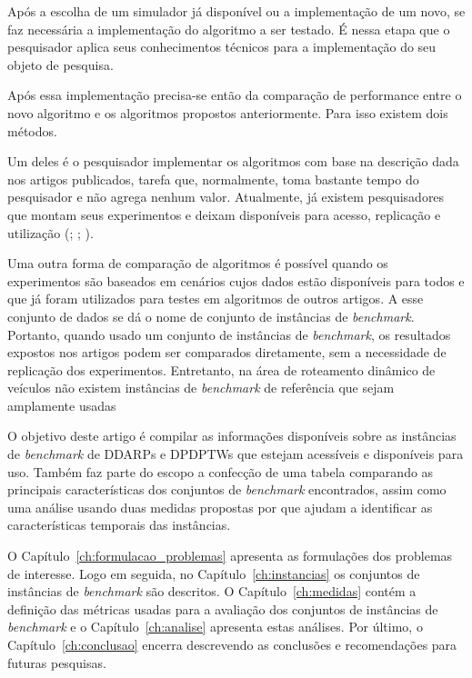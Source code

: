 Após a escolha de um simulador já disponível ou a implementação de um novo, se
faz necessária a implementação do algoritmo a ser testado. 
É nessa etapa que o pesquisador aplica seus conhecimentos técnicos para a 
implementação do seu objeto de pesquisa.

Após essa implementação precisa-se então da comparação de performance entre
o novo algoritmo e os algoritmos propostos anteriormente.
Para isso existem dois métodos.

Um deles é o pesquisador implementar os algoritmos com base na descrição dada 
nos artigos publicados, tarefa que, normalmente, toma bastante tempo do 
pesquisador e não agrega nenhum valor.
Atualmente, já existem pesquisadores que montam seus experimentos e deixam
disponíveis para acesso, replicação e utilização (\cite{van_lon_towards_2015};
\cite{van_lon_measures_2016}; \cite{van_lon_when_2017}).

Uma outra forma de comparação de algoritmos é possível quando os experimentos
são baseados em cenários cujos dados estão disponíveis para todos e
que já foram utilizados para testes em algoritmos de outros artigos.
A esse conjunto de dados se dá o nome de conjunto de instâncias de
\textit{benchmark}.
Portanto, quando usado um conjunto de instâncias de \textit{benchmark}, os
resultados expostos nos artigos podem ser comparados diretamente, sem a
necessidade de replicação dos experimentos.
Entretanto, na área de roteamento dinâmico de veículos não existem instâncias
de \textit{benchmark} de referência que sejam amplamente usadas
\cite{pillac_review_2013}

O objetivo deste artigo é compilar as informações disponíveis sobre as
instâncias de \textit{benchmark} de DDARPs e DPDPTWs que estejam acessíveis e
disponíveis para uso. Também faz parte do escopo a confecção de uma tabela
comparando as principais características dos conjuntos de \textit{benchmark}
encontrados, assim como uma análise usando duas medidas propostas por
\textcite{van_lon_measures_2016} que ajudam a identificar as características
temporais das instâncias.
\fi

O Capítulo~\ref{ch:formulacao_problemas} apresenta as formulações dos problemas
de interesse.
Logo em seguida, no Capítulo~\ref{ch:instancias} os conjuntos de instâncias de 
\textit{benchmark} são descritos.
O Capítulo~\ref{ch:medidas} contém a definição das métricas usadas para a 
avaliação dos conjuntos de instâncias de \textit{benchmark} e o 
Capítulo~\ref{ch:analise} apresenta estas análises.
Por último, o Capítulo~\ref{ch:conclusao} encerra descrevendo as conclusões  
e recomendações para futuras pesquisas.

